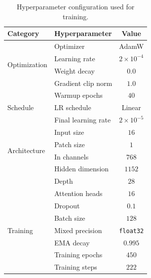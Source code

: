 \begin{table}
    \centering
    \caption{Hyperparameter configuration used for training.}
    \label{tab:exp1_params}
    \renewcommand{\arraystretch}{1.25}
    \begin{tabular}{@{}llc@{}}
        \toprule
        \textbf{Category}       & \textbf{Hyperparameter}       & \textbf{Value}        \\
        \midrule
        \multirow{4}{*}{Optimization}
                                & Optimizer                     & AdamW                 \\
                                & Learning rate                 & $2 \times 10^{-4}$    \\
                                & Weight decay                  & $0.0$    \\
                                & Gradient clip norm            & $1.0$                 \\
        \midrule
        \multirow{3}{*}{Schedule}
                                & Warmup epochs                 & $40$             \\
                                & LR schedule                   & Linear      \\
                                & Final learning rate           & $2 \times 10^{-5}$    \\
        \midrule
        \multirow{4}{*}{Architecture}
                                & Input size                    & $16$                 \\
                                & Patch size                    & $1$                 \\
                                & In channels                   & $768$                 \\
                                & Hidden dimension              & $1152$                 \\
                                & Depth                         & $28$                  \\
                                & Attention heads               & $16$                   \\
                                & Dropout                       & $0.1$                 \\
        \midrule
        \multirow{3}{*}{Training}
                                & Batch size                    & $128$                 \\
                                & Mixed precision               & \texttt{float32}     \\
                                & EMA decay                     & $0.995$              \\
                                & Training epochs               & $450$                 \\
                                & Training steps                & $222$                 \\
        \bottomrule
    \end{tabular}
\end{table} 
  

